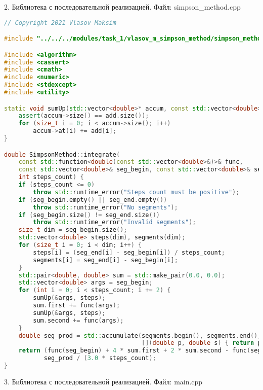 \documentclass{report}
\begin{document}
\par 2. Библиотека с последовательной реализацией. Файл: simpson\_method.cpp

\begin{lstlisting}[language=C++]
// Copyright 2021 Vlasov Maksim

#include "../../../modules/task_1/vlasov_m_simpson_method/simpson_method.h"

#include <algorithm>
#include <cassert>
#include <cmath>
#include <numeric>
#include <stdexcept>
#include <utility>

static void sumUp(std::vector<double>* accum, const std::vector<double>& add) {
    assert(accum->size() == add.size());
    for (size_t i = 0; i < accum->size(); i++)
        accum->at(i) += add[i];
}

double SimpsonMethod::integrate(
    const std::function<double(const std::vector<double>&)>& func,
    const std::vector<double>& seg_begin, const std::vector<double>& seg_end,
    int steps_count) {
    if (steps_count <= 0)
        throw std::runtime_error("Steps count must be positive");
    if (seg_begin.empty() || seg_end.empty())
        throw std::runtime_error("No segments");
    if (seg_begin.size() != seg_end.size())
        throw std::runtime_error("Invalid segments");
    size_t dim = seg_begin.size();
    std::vector<double> steps(dim), segments(dim);
    for (size_t i = 0; i < dim; i++) {
        steps[i] = (seg_end[i] - seg_begin[i]) / steps_count;
        segments[i] = seg_end[i] - seg_begin[i];
    }
    std::pair<double, double> sum = std::make_pair(0.0, 0.0);
    std::vector<double> args = seg_begin;
    for (int i = 0; i < steps_count; i += 2) {
        sumUp(&args, steps);
        sum.first += func(args);
        sumUp(&args, steps);
        sum.second += func(args);
    }
    double seg_prod = std::accumulate(segments.begin(), segments.end(), 1.0,
                                      [](double p, double s) { return p * s; });
    return (func(seg_begin) + 4 * sum.first + 2 * sum.second - func(seg_end)) *
           seg_prod / (3.0 * steps_count);
}
\end{lstlisting}

\par 3. Библиотека с последовательной реализацией. Файл: main.cpp
\end{document}
